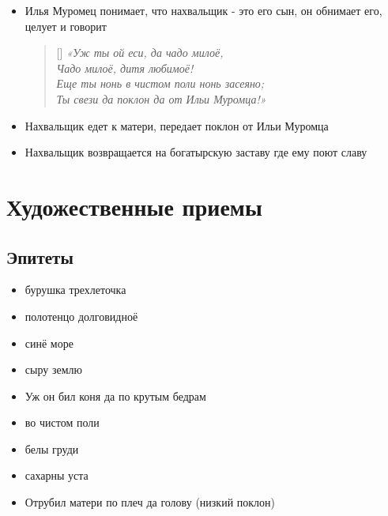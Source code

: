 \documentclass[a4paper, 12pt]{article}
\begin{document}
\begin{itemize}
    \item Илья Муромец понимает, что нахвальщик - это его сын, он обнимает его, целует и говорит
        \begin{verse}[\versewidth]
        \itshape
            «Уж ты ой еси, да чадо милоё,\\
            Чадо милоё, дитя любимоё!\\
            Еще ты нонь в чистом поли нонь засеяно;\\
            Ты свези да поклон да от Ильи Муромца!»
        \end{verse}
    \item Нахвальщик едет к матери, передает поклон от Ильи Муромца 
    \item Нахвальщик возвращается на богатырскую заставу где ему поют славу
\end{itemize}

\section{Художественные приемы}

\subsection{Эпитеты}
\begin{itemize}
    \item бурушка трехлеточка
    \item полотенцо долговидноё
    \item синё море
    \item сыру землю
    \item Уж он бил коня да по крутым бедрам
    \item во чистом поли
    \item белы груди
    \item сахарны уста
    \item Отрубил матери по плеч да голову (низкий поклон)
\end{itemize}
\end{document}
